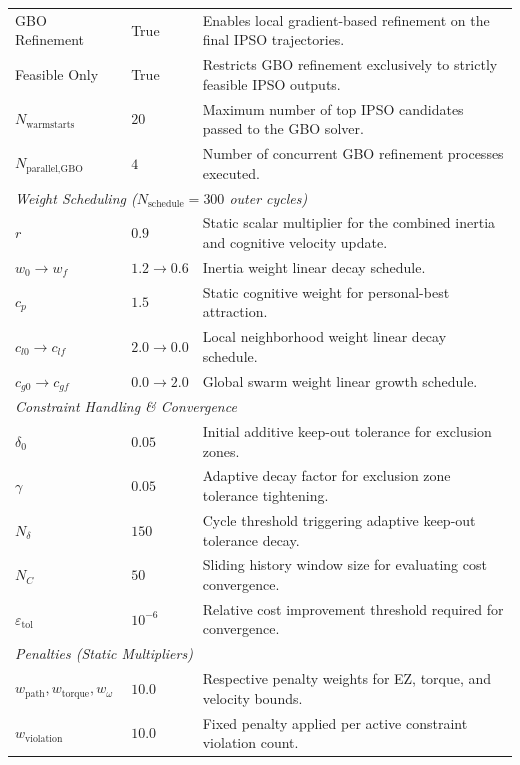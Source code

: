 \begin{longtable}{@{}p{}p{}p{}@{}}
        GBO Refinement & True & Enables local gradient-based refinement on the final IPSO trajectories. \\
        Feasible Only & True & Restricts GBO refinement exclusively to strictly feasible IPSO outputs. \\
        $N_{\text{warmstarts}}$ & $20$ & Maximum number of top IPSO candidates passed to the GBO solver. \\
        $N_{\text{parallel,GBO}}$ & $4$ & Number of concurrent GBO refinement processes executed. \\
        \midrule
        \multicolumn{3}{l}{\textit{Weight Scheduling ($N_{\text{schedule}} = 300$ outer cycles)}} \\
        $r$ & $0.9$ & Static scalar multiplier for the combined inertia and cognitive velocity update. \\
        $w_0 \to w_f$ & $1.2 \to 0.6$ & Inertia weight linear decay schedule. \\
        $c_p$ & $1.5$ & Static cognitive weight for personal-best attraction. \\
        $c_{l0} \to c_{lf}$ & $2.0 \to 0.0$ & Local neighborhood weight linear decay schedule. \\
        $c_{g0} \to c_{gf}$ & $0.0 \to 2.0$ & Global swarm weight linear growth schedule. \\
        \midrule
        \multicolumn{3}{l}{\textit{Constraint Handling \& Convergence}} \\
        $\delta_0$ & $0.05$ & Initial additive keep-out tolerance for exclusion zones. \\
        $\gamma$ & $0.05$ & Adaptive decay factor for exclusion zone tolerance tightening. \\
        $N_{\delta}$ & $150$ & Cycle threshold triggering adaptive keep-out tolerance decay. \\
        $N_C$ & $50$ & Sliding history window size for evaluating cost convergence. \\
        $\varepsilon_{\text{tol}}$ & $10^{-6}$ & Relative cost improvement threshold required for convergence. \\
        \midrule
        \multicolumn{3}{l}{\textit{Penalties (Static Multipliers)}} \\
        $w_{\text{path}}, w_{\text{torque}}, w_{\omega}$ & $10.0$ & Respective penalty weights for EZ, torque, and velocity bounds. \\
        $w_{\text{violation}}$ & $10.0$ & Fixed penalty applied per active constraint violation count. \\
        \bottomrule
\end{longtable}

